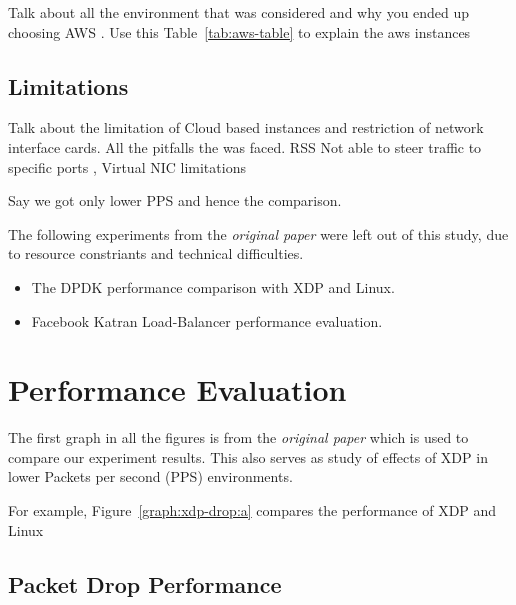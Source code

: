 \documentclass[12pt,titlepage]{article}
\begin{document}
Talk about all the environment that was considered and why you ended up choosing AWS . Use this Table~\ref{tab:aws-table} to explain the aws instances

\subsection{Limitations}

Talk about the limitation of Cloud based instances and restriction of network interface cards. All the pitfalls the was faced.
RSS Not able to steer traffic to specific ports  , Virtual NIC limitations 

Say we got only lower PPS and hence the comparison.

The following experiments from the \textit{original paper} were left out of this study, due to resource constriants and technical difficulties. 
\begin{itemize}
  \item The DPDK performance comparison with XDP and Linux.
  \item Facebook Katran Load-Balancer performance evaluation. 
\end{itemize}




\section{Performance Evaluation}

The first graph in all the figures is from the \textit{original paper} which is used to compare our experiment results. This also serves as study of effects of XDP in lower Packets per second (PPS) environments.

For example, Figure~\ref{graph:xdp-drop:a} compares the performance of XDP and Linux


\subsection{Packet Drop Performance}
\end{document}
